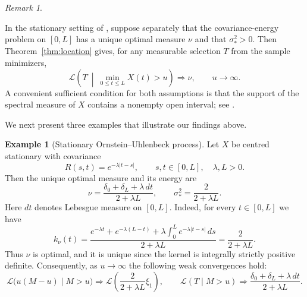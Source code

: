 \documentclass[11pt]{amsart}
\theoremstyle{definition}
\newtheorem{example}[example]{Example}
\theoremstyle{remark}
\newtheorem{remark}[remark]{Remark}
\begin{document}
\begin{remark}
\label{rem:stationary-setting}

 

In the stationary setting of \cite[Theorem~4.1]{wu2019high}, suppose
separately that the covariance-energy problem on $[0,L]$ has a unique
optimal measure $\nu$ and that $\sigma_*^2>0$.  Then
Theorem~\ref{thm:location} gives, for any measurable selection $T$ from
the sample minimizers,
\[
 \mathcal L\left(
 T\ \middle|\ \min_{0\leq t\leq L}X(t)>u
 \right)
 \Longrightarrow \nu,
 \qquad u\to\infty.
\] 
A convenient sufficient condition for both assumptions is that the support
of the spectral measure of $X$ contains a nonempty open interval; see
\cite[Proposition~2.1]{muirheadSevero2024percolation}.
\end{remark}

We next present three examples that illustrate our findings above.
 
\begin{example}[Stationary Ornstein--Uhlenbeck process]
Let $X$ be centred stationary with covariance
\[
 R(s,t)=e^{-\lambda|t-s|},\qquad s,t\in[0,L],\quad \lambda,L>0.
\]
Then the unique optimal measure and its energy are
\[
 \nu=\frac{\delta_0+\delta_L+\lambda\,dt}{2+\lambda L},
 \qquad
 \sigma_*^2=\frac{2}{2+\lambda L}.
\]
Here $dt$ denotes Lebesgue measure on $[0,L]$.
Indeed, for every $t\in[0,L]$ we have 
\[
 k_\nu(t)=\frac{e^{-\lambda t}+e^{-\lambda(L-t)}
 +\lambda\int_0^L e^{-\lambda|t-s|}\,ds}{2+\lambda L}
 =\frac{2}{2+\lambda L}.
\]
Thus $\nu$ is optimal, and it is unique since the kernel is integrally
strictly positive definite.  Consequently, as $u\to\infty$ the following weak convergences hold:
\[
 \mathcal L\bigl(u(M-u)\mid M>u\bigr)
 \Longrightarrow
 \mathcal L\left(\frac{2}{2+\lambda L}\xi_1\right),
 \qquad
 \mathcal L(T\mid M>u)\Longrightarrow
 \frac{\delta_0+\delta_L+\lambda\,dt}{2+\lambda L}.
\]
\end{example}
 
\end{document}
